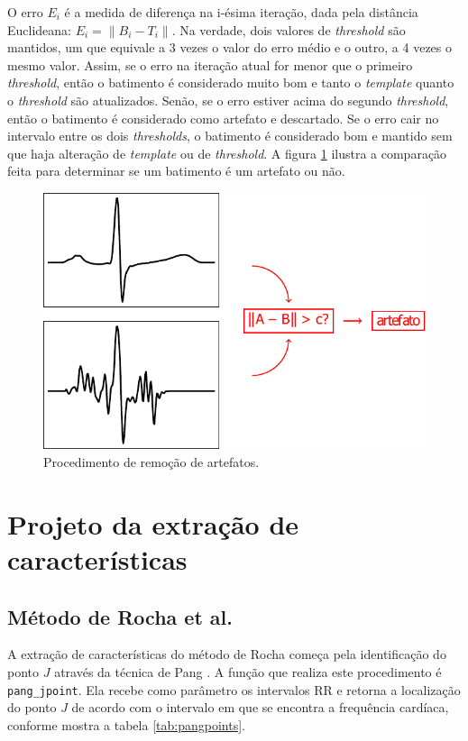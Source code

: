 O erro $E_i$ é a medida de diferença na i-ésima iteração, dada pela distância Euclideana: $E_i = \|B_i - T_i\|$. Na verdade, dois valores de \emph{threshold} são mantidos, um que equivale a 3 vezes o valor do erro médio e o outro, a 4 vezes o mesmo valor. Assim, se o erro na iteração atual for menor que o primeiro \emph{threshold}, então o batimento é considerado muito bom e tanto o \emph{template} quanto o \emph{threshold} são atualizados. Senão, se o erro estiver acima do segundo \emph{threshold}, então o batimento é considerado como artefato e descartado. Se o erro cair no intervalo entre os dois \emph{thresholds}, o batimento é considerado bom e mantido sem que haja alteração de \emph{template} ou de \emph{threshold}. A figura \ref{fig:artifact} ilustra a comparação feita para determinar se um batimento é um artefato ou não.

\begin{figure}[ht]
    \centering
    \includegraphics[width=400pt]{figures/chap6-artifact-removal.pdf}
    \caption[Procedimento de remoção de artefatos]{Procedimento de remoção de artefatos.}
    \label{fig:artifact}
\end{figure}

\section{Projeto da extração de características}

\subsection*{Método de Rocha et al.}
A extração de características do método de Rocha começa pela identificação do ponto $J$ através da técnica de Pang \cite{Pang2005}. A função que realiza este procedimento é \texttt{pang\_jpoint}. Ela recebe como parâmetro os intervalos RR e retorna a localização do ponto $J$ de acordo com o intervalo em que se encontra a frequência cardíaca, conforme mostra a tabela \ref{tab:pangpoints}.

